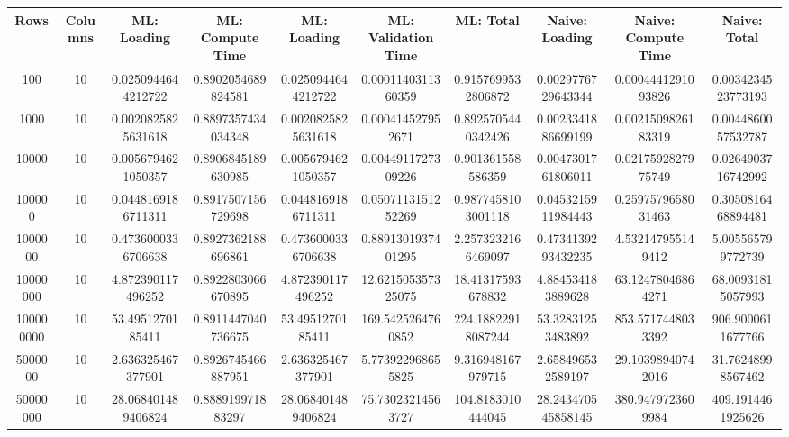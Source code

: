 \begin{table}[htb]
    \centering
    \begin{tabular}{@{}cccccccccc@{}}
        \toprule
        Rows & Columns & ML: Loading & ML: Compute Time & ML: Loading & ML: Validation Time & ML: Total & Naive: Loading & Naive: Compute Time & Naive: Total \\
        \midrule
        100 & 10 & 0.0250944644212722 & 0.8902054689824581 & 0.0250944644212722 & 0.0001140311360359 & 0.9157699532806872 & 0.0029776729643344 & 0.0004441291093826 & 0.0034234523773193 \\
        1000 & 10 & 0.0020825825631618 & 0.8897357434034348 & 0.0020825825631618 & 0.000414527952671 & 0.8925705440342426 & 0.0023341886699199 & 0.0021509826183319 & 0.0044860057532787 \\
        10000 & 10 & 0.0056794621050357 & 0.8906845189630985 & 0.0056794621050357 & 0.0044911727309226 & 0.901361558586359 & 0.0047301761806011 & 0.0217592827975749 & 0.0264903716742992 \\
        100000 & 10 & 0.0448169186711311 & 0.8917507156729698 & 0.0448169186711311 & 0.0507113151252269 & 0.9877458103001118 & 0.0453215911984443 & 0.2597579658031463 & 0.3050816468894481 \\
        1000000 & 10 & 0.4736000336706638 & 0.8927362188696861 & 0.4736000336706638 & 0.8891301937401295 & 2.2573232166469097 & 0.4734139293432235 & 4.532147955149412 & 5.005565799772739 \\
        10000000 & 10 & 4.872390117496252 & 0.8922803066670895 & 4.872390117496252 & 12.621505357325075 & 18.41317593678832 & 4.884534183889628 & 63.12478046864271 & 68.00931815057993 \\
        100000000 & 10 & 53.4951270185411 & 0.8911447040736675 & 53.4951270185411 & 169.5425264760852 & 224.18822918087244 & 53.32831253483892 & 853.5717448033392 & 906.9000611677766 \\
        5000000 & 10 & 2.636325467377901 & 0.8926745466887951 & 2.636325467377901 & 5.773922968655825 & 9.316948167979715 & 2.658496532589197 & 29.10398940742016 & 31.76248998567462 \\
        50000000 & 10 & 28.068401489406824 & 0.888919971883297 & 28.068401489406824 & 75.73023214563727 & 104.8183010444045 & 28.243470545858145 & 380.9479723609984 & 409.1914461925626 \\
        \bottomrule
    \end{tabular}
\end{table}